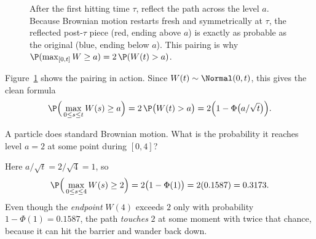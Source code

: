 \begin{figure}[H]
\centering
{}
\caption{After the first hitting time $\tau$, reflect the path across the level $a$.
Because Brownian motion restarts fresh and symmetrically at $\tau$, the reflected
post-$\tau$ piece (red, ending above $a$) is exactly as probable as the original
(blue, ending below $a$). This pairing is why
$\P(\max_{[0,t]}W\ge a)=2\,\P(W(t)>a)$.}
\label{ch29:fig-reflection}
\end{figure}

Figure~\ref{ch29:fig-reflection} shows the pairing in action. Since
$W(t)\sim\Normal(0,t)$, this gives the clean formula
\[
  \P\Big(\max_{0\le s\le t}W(s)\ge a\Big)
  = 2\,\P\big(W(t)>a\big)
  = 2\Big(1-\Phi\big(a/\sqrt t\big)\Big).
\]

\begin{example}
\label{ch29:ex-barrier}
A particle does standard Brownian motion. What is the probability it reaches level
$a=2$ at some point during $[0,4]$?

Here $a/\sqrt t = 2/\sqrt4 = 1$, so
\[
  \P\Big(\max_{0\le s\le4}W(s)\ge 2\Big) = 2\big(1-\Phi(1)\big)
  = 2(0.1587) = 0.3173.
\]
Even though the \emph{endpoint} $W(4)$ exceeds $2$ only with probability
$1-\Phi(1)=0.1587$, the path \emph{touches} $2$ at some moment with twice that
chance, because it can hit the barrier and wander back down.
\end{example}

